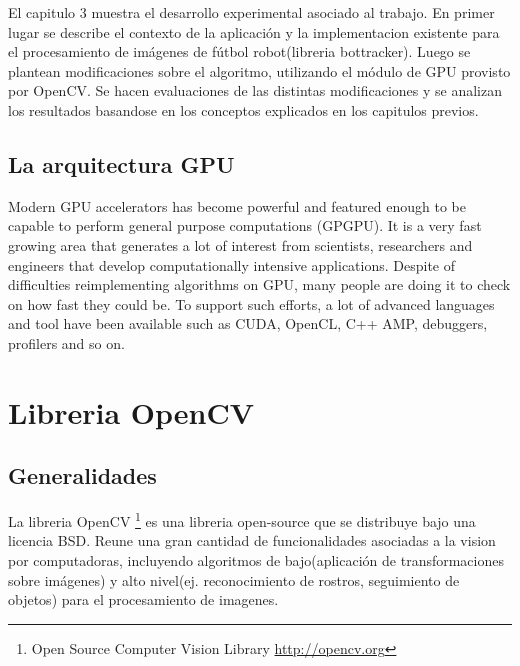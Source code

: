 \documentclass[a4paper,10pt]{report}
\begin{document}
El capitulo 3 muestra el desarrollo experimental asociado al trabajo. En primer lugar se describe el contexto de la aplicación y la implementacion existente para el procesamiento de imágenes de fútbol robot(libreria bottracker).
Luego se plantean modificaciones sobre el algoritmo, utilizando el módulo de GPU provisto por OpenCV. Se hacen evaluaciones de las distintas modificaciones y se analizan los resultados basandose en los conceptos explicados en los capitulos previos.






\section{La arquitectura GPU}






Modern GPU accelerators has become powerful and featured enough to be capable to perform general purpose computations (GPGPU).  It is a very fast growing area that generates a lot of interest from scientists, researchers and engineers that develop computationally intensive applications. Despite of difficulties reimplementing algorithms on GPU, many people are doing it to check on how fast they could be. 
To support such efforts, a lot of advanced languages and tool have been available such as CUDA, OpenCL, C++ AMP, debuggers, profilers and so on.
















\chapter{Libreria OpenCV}

\section{Generalidades}
La libreria OpenCV \footnote{Open Source Computer Vision Library \url{http://opencv.org}} es una libreria open-source que se distribuye bajo una licencia BSD. 
Reune una gran cantidad de funcionalidades asociadas a la vision por computadoras, incluyendo algoritmos de bajo(aplicación de transformaciones sobre imágenes) y alto nivel(ej. reconocimiento de rostros, seguimiento de objetos) para el procesamiento de imagenes.
\end{document}
